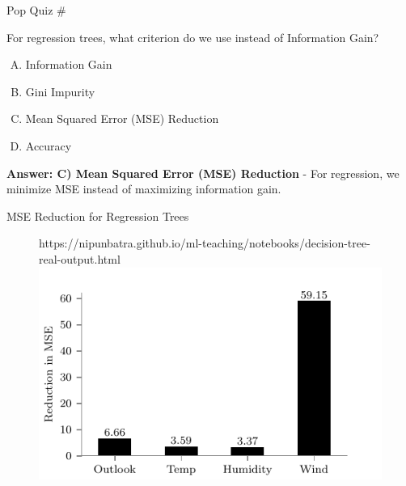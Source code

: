 \documentclass[usenames,dvipsnames]{beamer}
\begin{document}
\begin{frame}{Pop Quiz \#\thepopquiz}
\begin{tcolorbox}[colback=blue!5!white,colframe=blue!75!black,title=Quick Question!]
For regression trees, what criterion do we use instead of Information Gain?
\begin{enumerate}[A)]
\item Information Gain
\item Gini Impurity
\item Mean Squared Error (MSE) Reduction
\item Accuracy
\end{enumerate}
\pause
\textbf{Answer: C) Mean Squared Error (MSE) Reduction} - For regression, we minimize MSE instead of maximizing information gain.
\end{tcolorbox}
\end{frame}

\begin{frame}{MSE Reduction for Regression Trees}

	\begin{figure}[htp]
		\centering
		\begin{notebookbox}{https://nipunbatra.github.io/ml-teaching/notebooks/decision-tree-real-output.html}
		  \includegraphics[width=\linewidth]{../assets/decision-trees/figures/discrete-input-real-output-level-1.pdf}
		\end{notebookbox}
	  \end{figure}

\end{frame}
\end{document}
